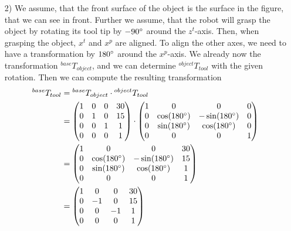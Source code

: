 \documentclass[a4paper,11pt]{article}
\begin{document}
\begin {enumerate}
\begin{enumerate}
        \item[2)]
        We assume, that the front surface of the object is the surface in the figure, that we can see in front. Further we assume, that the robot will grasp the object by rotating its tool tip by $-90\degree$ around the $z^t$-axis. Then, when grasping the object, $x^t$ and $x^p$ are aligned. To align the other axes, we need to have a transformation by $180\degree$ around the $x^p$-axis. We already now the transformation ${^{base}T_{object}}$, and we can determine ${^{object}T_{tool}}$ with the given rotation. Then we can compute the resulting transformation
        \begin{align*}
          {^{base}T_{tool}} &= {^{base}T_{object}} \cdot {^{object}T_{tool}}\\
          &= \begin{pmatrix}
            1 & 0 & 0 & 30\\
            0 & 1 & 0 & 15\\
            0 & 0 & 1 & 1\\
            0 & 0 & 0 & 1
          \end{pmatrix} \cdot \begin{pmatrix}
            1 & 0 & 0 & 0\\
            0 & \cos(180\degree) & -\sin(180\degree) & 0\\
            0 & \sin(180\degree) & \cos(180\degree) & 0\\
            0 & 0 & 0 & 1
          \end{pmatrix}\\
          &= \begin{pmatrix}
            1 & 0 & 0 & 30\\
            0 & \cos(180\degree) & -\sin(180\degree) & 15\\
            0 & \sin(180\degree) & \cos(180\degree) & 1\\
            0 & 0 & 0 & 1
          \end{pmatrix}\\
          &= \begin{pmatrix}
            1 & 0 & 0 & 30\\
            0 & -1 & 0 & 15\\
            0 & 0 & -1 & 1\\
            0 & 0 & 0 & 1
          \end{pmatrix}
        \end{align*}




\end{enumerate}
\end{enumerate}
\end{document}
